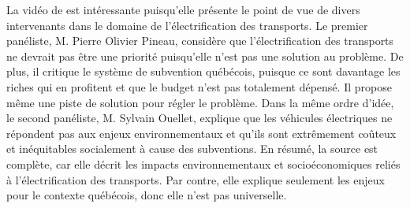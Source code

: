 La vidéo de   est intéressante puisqu’elle présente le point de vue de divers intervenants dans le domaine de l’électrification des transports. Le premier panéliste, M. Pierre Olivier Pineau, considère que l’électrification des transports ne devrait pas être une priorité puisqu’elle n’est pas une solution au problème. De plus, il critique le système de subvention québécois, puisque ce sont davantage les riches qui en profitent et que le budget n’est pas totalement dépensé. Il propose même une piste de solution pour régler le problème. Dans la même ordre d’idée, le second panéliste, M. Sylvain Ouellet, explique que les véhicules électriques ne répondent pas aux enjeux environnementaux et qu’ils sont extrêmement coûteux et inéquitables socialement à cause des subventions. En résumé, la source est complète, car elle décrit les impacts environnementaux et socioéconomiques reliés à l’électrification des transports. Par contre, elle explique seulement les enjeux pour le contexte québécois, donc elle n’est pas universelle.


